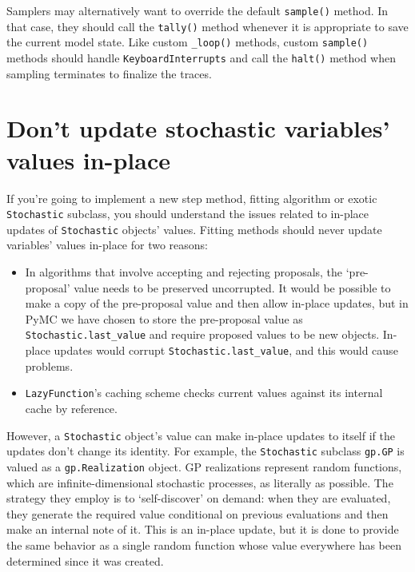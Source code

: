 Samplers may alternatively want to override the default \texttt{sample()} method. In that case, they should call the \texttt{tally()} method whenever it is appropriate to save the current model state. Like custom \texttt{_loop()} methods, custom \texttt{sample()} methods should handle \texttt{KeyboardInterrupts} and call the \texttt{halt()} method when sampling terminates to finalize the traces.

\hypertarget{dont-update-indepth}{}
\section*{Don't update stochastic variables' values in-place} \label{dont-update-indepth}

If you're going to implement a new step method, fitting algorithm or exotic \texttt{Stochastic} subclass, you should understand the issues related to in-place updates of \texttt{Stochastic} objects' values. Fitting methods should never update variables' values in-place for two reasons:
\begin{itemize}
   \item In algorithms that involve accepting and rejecting proposals, the `pre-proposal' value needs to be preserved uncorrupted. It would be possible to make a copy of the pre-proposal value and then allow in-place updates, but in PyMC we have chosen to store the pre-proposal value as \texttt{Stochastic.last_value} and require proposed values to be new objects. In-place updates would corrupt \texttt{Stochastic.last_value}, and this would cause problems.
   \item \texttt{LazyFunction}'s caching scheme checks current values against its internal cache by reference.
\end{itemize}

However, a \texttt{Stochastic} object's value can make in-place updates to itself if the updates don't change its identity. For example, the \texttt{Stochastic} subclass \texttt{gp.GP} is valued as a \texttt{gp.Realization} object. GP realizations represent random functions, which are infinite-dimensional stochastic processes, as literally as possible. The strategy they employ is to `self-discover' on demand: when they are evaluated, they generate the required value conditional on previous evaluations and then make an internal note of it. This is an in-place update, but it is done to provide the same behavior as a single random function whose value everywhere has been determined since it was created.